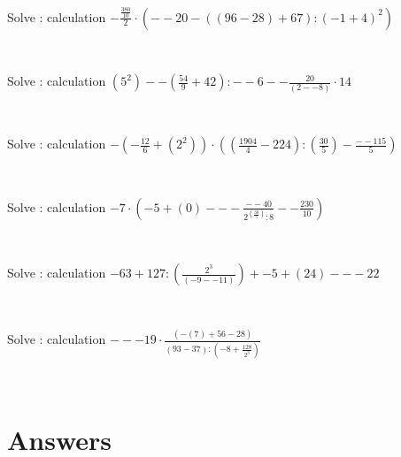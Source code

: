 \documentclass[english,course]{lecture}
\begin{document}
\begin{enumerate}
\begin{minipage}{\linewidth}
\end{minipage} \\
\begin{minipage}{\linewidth}
\item Solve : calculation 
\(-\frac{\frac{380}{10}}{2} \cdot \left(--20-\left(\left(96-28\right)+67\right):{\left(-1+4\right)}^{2}\right)\)
\end{minipage} \\
\begin{minipage}{\linewidth}
\item Solve : calculation 
\(\left({5}^{2}\right)--\left(\frac{54}{9}+42\right):--6--\frac{20}{\left(2--8\right)} \cdot 14\)
\end{minipage} \\
\begin{minipage}{\linewidth}
\item Solve : calculation 
\(-\left(-\frac{12}{6}+\left({2}^{2}\right)\right) \cdot \left(\left(\frac{1904}{4}-224\right):\left(\frac{30}{5}\right)-\frac{--115}{5}\right)\)
\end{minipage} \\
\begin{minipage}{\linewidth}
\item Solve : calculation 
\(-7 \cdot \left(-5+\left(0\right)---\frac{--40}{{2}^{\left(\frac{30}{5}\right)}:8}--\frac{230}{10}\right)\)
\end{minipage} \\
\begin{minipage}{\linewidth}
\item Solve : calculation 
\(-63+127:\left(\frac{{2}^{3}}{\left(-9--11\right)}\right)+-5+\left(24\right)---22\)
\end{minipage} \\
\begin{minipage}{\linewidth}
\item Solve : calculation 
\(---19 \cdot \frac{\left(-\left(7\right)+56-28\right)}{\left(93-37\right):\left(-8+\frac{128}{{2}^{3}}\right)}\)
\end{minipage} \\
\end{enumerate}
\part{Answers }
\end{document}
